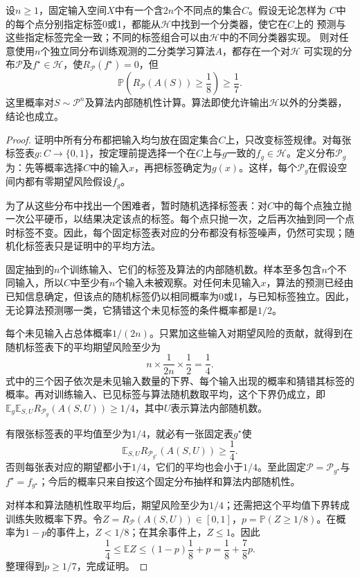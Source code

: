 \begin{theorem}[没有免费的午餐]
\label{thm:no-free-lunch-classification}
设$n\geq1$，固定输入空间$X$中有一个含$2n$个不同点的集合$C$。假设无论怎样为
$C$中的每个点分别指定标签0或1，都能从$\mathcal H$中找到一个分类器，使它在$C$上的
预测与这些指定标签完全一致；不同的标签组合可以由$\mathcal H$中的不同分类器实现。
则对任意使用$n$个独立同分布训练观测的二分类学习算法$A$，都存在一个对$\mathcal H$
可实现的分布$\mathcal P$及$f^\star\in\mathcal H$，使$R_{\mathcal P}(f^\star)=0$，但
\begin{equation}
 \mathbb P\left(R_{\mathcal P}(A(S))\geq\frac18\right)\geq\frac17.
 \label{eq:no-free-lunch-probability}
\end{equation}
这里概率对$S\sim\mathcal P^n$及算法内部随机性计算。算法即使允许输出$\mathcal H$以外的分类器，结论也成立。
\end{theorem}

\begin{proof}
证明中所有分布都把输入均匀放在固定集合$C$上，只改变标签规律。对每张标签表$g:C\to\{0,1\}$，按定理前提选择一个在$C$上与$g$一致的$f_g\in\mathcal H$。定义分布$\mathcal P_g$为：先等概率选择$C$中的输入$x$，再把标签确定为$g(x)$。这样，每个$\mathcal P_g$在假设空间内都有零期望风险假设$f_g$。

为了从这些分布中找出一个困难者，暂时随机选择标签表：对$C$中的每个点独立抛一次公平硬币，以结果决定该点的标签。每个点只抛一次，之后再次抽到同一个点时标签不变。因此，每个固定标签表对应的分布都没有标签噪声，仍然可实现；随机化标签表只是证明中的平均方法。

固定抽到的$n$个训练输入、它们的标签及算法的内部随机数。样本至多包含$n$个不同输入，所以$C$中至少有$n$个输入未被观察。对任何未见输入$x$，算法的预测已经由已知信息确定，但该点的随机标签仍以相同概率为0或1，与已知标签独立。因此，无论算法预测哪一类，它猜错这个未见标签的条件概率都是$1/2$。

每个未见输入占总体概率$1/(2n)$。只累加这些输入对期望风险的贡献，就得到在随机标签表下的平均期望风险至少为
\begin{equation}
 n\times\frac1{2n}\times\frac12=\frac14.
 \label{eq:no-free-lunch-expected-risk}
\end{equation}
式中的三个因子依次是未见输入数量的下界、每个输入出现的概率和猜错其标签的概率。再对训练输入、已见标签与算法随机数取平均，这个下界仍成立，即$\mathbb E_g\mathbb E_{S,U}R_{\mathcal P_g}(A(S,U))\geq1/4$，其中$U$表示算法内部随机数。

有限张标签表的平均值至少为$1/4$，就必有一张固定表$g^\star$使
\[
 \mathbb E_{S,U}R_{\mathcal P_{g^\star}}(A(S,U))\geq\frac14.
\]
否则每张表对应的期望都小于$1/4$，它们的平均也会小于$1/4$。至此固定$\mathcal P=\mathcal P_{g^\star}$与$f^\star=f_{g^\star}$；今后的概率只来自按这个固定分布抽样和算法内部随机性。

对样本和算法随机性取平均后，期望风险至少为$1/4$；还需把这个平均值下界转成训练失败概率下界。令$Z=R_{\mathcal P}(A(S,U))\in[0,1]$，$p=\mathbb P(Z\geq1/8)$。在概率为$1-p$的事件上，$Z<1/8$；在其余事件上，$Z\leq1$。因此
\[
 \frac14\leq\mathbb E Z\leq(1-p)\frac18+p
 =\frac18+\frac78p.
\]
整理得到$p\geq1/7$，完成证明。
\end{proof}

